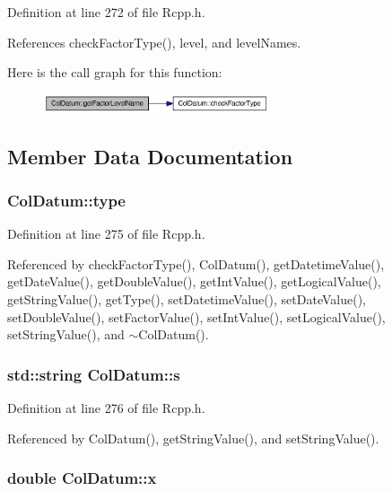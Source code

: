 Definition at line 272 of file Rcpp.h.

References checkFactorType(), level, and levelNames.

Here is the call graph for this function:\nopagebreak
\begin{figure}[H]
\begin{center}
\leavevmode
\includegraphics[width=189pt]{classColDatum_012df5970083052c2348cbda9ed646bb_cgraph}
\end{center}
\end{figure}


\subsection{Member Data Documentation}
\hypertarget{classColDatum_c539e7f62828f2683f1825a84a19d231}{
\subsubsection[type]{ {\bf ColDatum::type}}}
\label{classColDatum_c539e7f62828f2683f1825a84a19d231}




Definition at line 275 of file Rcpp.h.

Referenced by checkFactorType(), ColDatum(), getDatetimeValue(), getDateValue(), getDoubleValue(), getIntValue(), getLogicalValue(), getStringValue(), getType(), setDatetimeValue(), setDateValue(), setDoubleValue(), setFactorValue(), setIntValue(), setLogicalValue(), setStringValue(), and $\sim$ColDatum().\hypertarget{classColDatum_5a1c85e1da2da02052078a3c8d810be9}{
\subsubsection[s]{\setlength{\rightskip}{0pt plus 5cm}std::string {\bf ColDatum::s}}}
\label{classColDatum_5a1c85e1da2da02052078a3c8d810be9}




Definition at line 276 of file Rcpp.h.

Referenced by ColDatum(), getStringValue(), and setStringValue().\hypertarget{classColDatum_6d3d286cbd6c4ad24f1f12266662e42e}{
\subsubsection[x]{\setlength{\rightskip}{0pt plus 5cm}double {\bf ColDatum::x}}}
\label{classColDatum_6d3d286cbd6c4ad24f1f12266662e42e}




